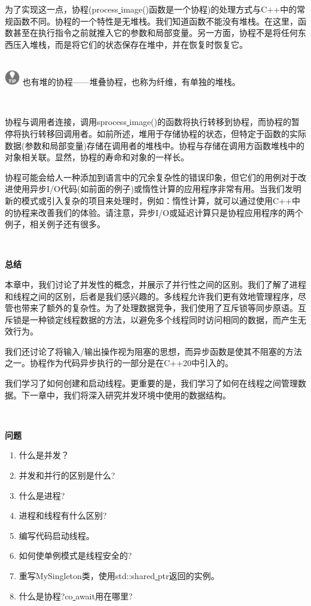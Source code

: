 为了实现这一点，协程(process\underline{ }image()函数是一个协程)的处理方式与C++中的常规函数不同。协程的一个特性是无堆栈。我们知道函数不能没有堆栈。在这里，函数甚至在执行指令之前就推入它的参数和局部变量。另一方面，协程不是将任何东西压入堆栈，而是将它们的状态保存在堆中，并在恢复时恢复它。 \par

\hspace*{\fill} \\ %
\includegraphics[width=0.05\textwidth]{images/tip}
也有堆的协程——堆叠协程，也称为纤维，有单独的堆栈。 \par
\noindent\textbf{}\ \par

协程与调用者连接，调用sprocess\underline{ }image()的函数将执行转移到协程，而协程的暂停将执行转移回调用者。如前所述，堆用于存储协程的状态，但特定于函数的实际数据(参数和局部变量)存储在调用者的堆栈中。协程与存储在调用方函数堆栈中的对象相关联。显然，协程的寿命和对象的一样长。 \par
协程可能会给人一种添加到语言中的冗余复杂性的错误印象，但它们的用例对于改进使用异步I/O代码(如前面的例子)或惰性计算的应用程序非常有用。当我们发明新的模式或引入复杂的项目来处理时，例如：惰性计算，就可以通过使用C++中的协程来改善我们的体验。请注意，异步I/O或延迟计算只是协程应用程序的两个例子，相关例子还有很多。 \par

\noindent\textbf{}\ \par
\textbf{总结} \ \par
本章中，我们讨论了并发性的概念，并展示了并行性之间的区别。我们了解了进程和线程之间的区别，后者是我们感兴趣的。多线程允许我们更有效地管理程序，尽管也带来了额外的复杂性。为了处理数据竞争，我们使用了互斥锁等同步原语。互斥锁是一种锁定线程数据的方法，以避免多个线程同时访问相同的数据，而产生无效行为。 \par
我们还讨论了将输入/输出操作视为阻塞的思想，而异步函数是使其不阻塞的方法之一。协程作为代码异步执行的一部分是在C++20中引入的。 \par
我们学习了如何创建和启动线程。更重要的是，我们学习了如何在线程之间管理数据。下一章中，我们将深入研究并发环境中使用的数据结构。 \par

\noindent\textbf{}\ \par
\textbf{问题} \ \par
\begin{enumerate}
	\item 什么是并发？
	\item 并发和并行的区别是什么?
	\item 什么是进程?
	\item 进程和线程有什么区别?
	\item 编写代码启动线程。
	\item 如何使单例模式是线程安全的?
	\item 重写MySingleton类，使用std::shared\underline{ }ptr返回的实例。
	\item 什么是协程?co\underline{ }await用在哪里?
\end{enumerate}

